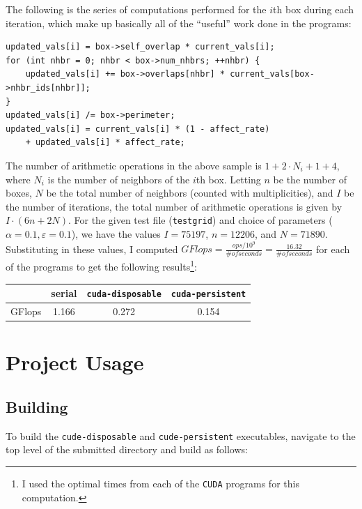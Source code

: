 \documentclass{article}
\begin{document}
\pagebreak
The following is the series of computations performed for the $i$th box during each iteration,
which make up basically all of the ``useful'' work done in the programs:

\begin{lstlisting}[style=DOS]
updated_vals[i] = box->self_overlap * current_vals[i];
for (int nhbr = 0; nhbr < box->num_nhbrs; ++nhbr) {
    updated_vals[i] += box->overlaps[nhbr] * current_vals[box->nhbr_ids[nhbr]];
}
updated_vals[i] /= box->perimeter;
updated_vals[i] = current_vals[i] * (1 - affect_rate)
    + updated_vals[i] * affect_rate;
\end{lstlisting}

The number of arithmetic operations in the above sample is $1 + 2 \cdot N_i + 1 + 4$, where
$N_i$ is the number of neighbors of the $i$th box. Letting $n$ be the number of boxes,
$N$ be the total number of neighbors (counted with multiplicities), and $I$ be the number of iterations,
the total number of arithmetic operations is given by $I\cdot (6n + 2N)$. For the given test file
(\texttt{testgrid}) and choice of
parameters ($\alpha=0.1, \varepsilon=0.1$), we have the values $I=75197$, $n=12206$, and $N=71890$.
Substituting in these values, I computed $GFlops = \frac{ops / 10^9}{\# of seconds} = \frac{16.32}{\# of seconds}$
for each of the programs to get the following results\footnote{I
used the optimal times from each of the \texttt{CUDA} programs for this computation.}:

\begin{center}
\begin{tabular}{|c|c|c|c|}
\cline{2-4}
\multicolumn{1}{c|}{} & serial & \texttt{cuda-disposable} & \texttt{cuda-persistent} \\
\hline
GFlops & 1.166 & 0.272 & 0.154 \\
\hline
\end{tabular}
\end{center}

\section*{Project Usage}
\label{sec:project}

\subsection*{Building}
\label{subsec:building}

To build the \texttt{cude-disposable} and \texttt{cude-persistent} executables, navigate
to the top level of the submitted directory and build as follows:
\end{document}
